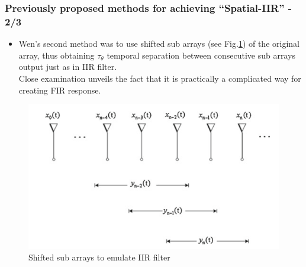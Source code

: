 \documentclass[10pt,pdflatex,headrule,landscape]{beamer}
\begin{document}
\begin{frame}
\frametitle{Previously proposed methods for achieving ``Spatial-IIR'' - 2/3}
\begin{minipage}{0.75\textwidth}
\begin{itemize}
\item
{
Wen's second method was to use shifted sub arrays (see Fig.\ref{fig:ShiftedSubArraysWen}) of the original array, thus obtaining $ \tau_{\theta} $ temporal separation between consecutive sub arrays output just as in IIR filter.
\\
Close examination unveils the fact that it is practically a complicated way for creating FIR response.
}
\end{itemize}
\end{minipage}
\begin{minipage}{0.24\textwidth}
\begin{figure}
\includegraphics[width=\textwidth]{Media/SpatialIIR_SubArrays.PNG}
\caption{Shifted sub arrays to emulate IIR filter}
\label{fig:ShiftedSubArraysWen}
\end{figure}
\end{minipage}
\end{frame}
\end{document}
